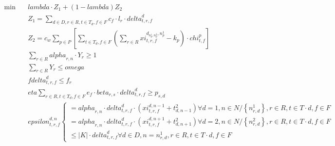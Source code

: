 \begin{align}
  \min\quad & \mathit{lambda} \cdot Z_{1} + \left(1 - \mathit{lambda}\right) Z_{2} \tag{eq\_0001} \\
  & Z_{1} = \sum_{d \in D, r \in R, t \in T_{d}, f \in F} c_{f} \cdot l_{r} \cdot \mathit{delta}_{t , r , f}^{d} \tag{eq\_0002} \\
  & Z_{2} = c_{w} \sum_{p \in P} \left[\sum_{t \in T_{d}, f \in F} \left(\sum_{r \in R} \mathit{xi}_{t , r , f}^{d_{n_{p}^{1} , n_{p}^{2}} , n_{p}^{1}} - k_{p}\right) \cdot \mathit{chi}_{t , f}^{p}\right] \tag{eq\_0003} \\
  & \sum_{r \in R} \mathit{alpha}_{r , n} \cdot Y_{r} \geq 1 \tag{eq\_0004} \\
  & \sum_{r \in R} Y_{r} \leq \mathit{omega} \tag{eq\_0005} \\
  & f \mathit{delta}_{t , r , f}^{d} \leq f_{r} \tag{eq\_0006} \\
  & \mathit{eta} \sum_{r \in R, t \in T_{d}, f \in F} e_{f} \cdot \mathit{beta}_{r , s} \cdot \mathit{delta}_{t , r , f}^{d} \geq p_{s , d} \tag{eq\_0007} \\
  & \mathit{epsilon}_{t , r , f}^{d , n} \begin{cases} = \mathit{alpha}_{r , n} \cdot \mathit{delta}_{t , r , f}^{d} \cdot \left(\mathit{xi}_{t , r , f}^{d , n - 1} + t_{d , n - 1}^{2}\right) \forall d = 1 , n \in N / \left\{n_{r , d}^{1}\right\} , r \in R , t \in T \cdot d , f \in F \\ = \mathit{alpha}_{r , n} \cdot \mathit{delta}_{t , r , f}^{d} \cdot \left(\mathit{xi}_{t , r , f}^{d , n + 1} + t_{d , n + 1}^{2}\right) \forall d = 2 , n \in N / \left\{n_{r , d}^{2}\right\} , r \in R , t \in T \cdot d , f \in F \\ \leq \left|K\right| \cdot \mathit{delta}_{t , r , f}^{d} \forall d \in D , n = n_{r , d}^{1} , r \in R , t \in T \cdot d , f \in F \end{cases} \tag{eq\_0008} \\

\end{align}

